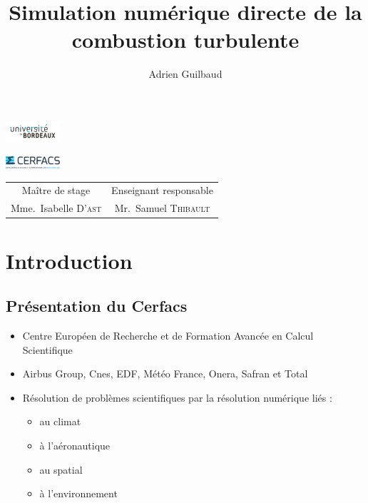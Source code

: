 \documentclass{beamer}
\author{Adrien Guilbaud}
\title{Simulation numérique directe de la combustion turbulente}
\begin{document}
 

\begin{frame}
    \parbox[c]{-50cm}{\centering%
      \includegraphics[width=2cm]{figures/logo_fac.jpg}%
    }%
    \parbox[c]{19.5cm}{\centering%
      \includegraphics[width=2cm]{figures/logo_cerfacs.eps}
    }%
\maketitle

\centering
\footnotesize
\begin{tabular}{cc}
  Maître de stage & Enseignant responsable \\
  Mme.~Isabelle \textsc{D'ast} &   Mr.~Samuel \textsc{Thibault} \\
  \end{tabular}
\end{frame}

%
%

\section{Introduction}
\subsection{Présentation du Cerfacs}
\begin{frame}
  \begin{itemize}
  \item Centre Européen de Recherche et de Formation Avancée en Calcul Scientifique
  \item Airbus Group, Cnes, EDF, Météo France, Onera, Safran et Total
  
    \item Résolution de problèmes scientifiques par la résolution numérique liés :
	\begin{itemize}
  \item au climat
  \item à l'aéronautique
  \item au spatial
  \item à l'environnement
  \end{itemize}
  \end{itemize}


  
\end{frame}
\end{document}
